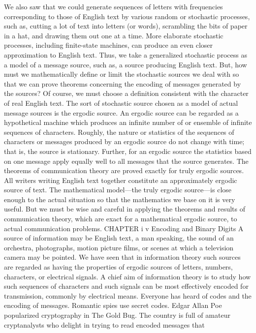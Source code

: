 We also saw that we could generate sequences of letters with
frequencies corresponding to those of English text by various random
or stochastic processes, such as, cutting a lot of text into letters
(or words), scrambling the bits of paper in a hat, and drawing them
out one at a time. More elaborate stochastic processes, including
finite-state machines, can produce an even closer approximation
to English text.
Thus, we take a generalized stochastic process as a model of a
message source, such as, a source producing English text. But, how
must we mathematically define or limit the stochastic sources we
deal with so that we can prove theorems concerning the encoding
of messages generated by the sources? Of course, we must choose
a definition consistent with the character of real English text.
The sort of stochastic source chosen as a model of actual message
sources is the ergodic source. An ergodic source can be regarded
as a hypothetical machine which produces an infinite number of
or ensemble of infinite sequences of characters. Roughly, the nature
or statistics of the sequences of characters or messages produced
by an ergodic source do not change with time; that is, the source
is stationary. Further, for an ergodic source the statistics based on
one message apply equally well to all messages that the source
generates.
The theorems of communication theory are proved exactly for
truly ergodic sources. All writers writing English text together
constitute an approximately ergodic source of text. The mathematical
model—the truly ergodic source—is close enough to the
actual situation so that the mathematics we base on it is very
useful. But we must be wise and careful in applying the theorems
and results of communication theory, which are exact for a mathematical
ergodic source, to actual communication problems.
CHAPTER i v Encoding and
Binary Digits
A source of information may be English text, a man speaking,
the sound of an orchestra, photographs, motion picture films, or
scenes at which a television camera may be pointed. We have seen
that in information theory such sources are regarded as having the
properties of ergodic sources of letters, numbers, characters, or
electrical signals. A chief aim of information theory is to study how
such sequences of characters and such signals can be most effectively
encoded for transmission, commonly by electrical means.
Everyone has heard of codes and the encoding of messages.
Romantic spies use secret codes. Edgar Allan Poe popularized
cryptography in The Gold Bug. The country is full of amateur
cryptanalysts who delight in trying to read encoded messages that

